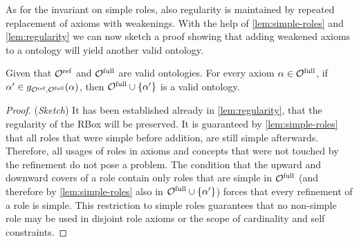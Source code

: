 As for the invariant on simple roles, also regularity is maintained by repeated replacement of axioms with weakenings. With the help of \cref{lem:simple-roles} and \cref{lem:regularity} we can now sketch a proof showing that adding weakened axioms to a \SROIQ ontology will yield another valid \SROIQ ontology.

\begin{theorem} \label{lem:global-constraints}
  Given that ${\mathcal{O}^\textnormal{ref}}$ and ${\mathcal{O}^\textnormal{full}}$ are valid \SROIQ ontologies. For every axiom $\alpha \in {\mathcal{O}^\textnormal{full}}$, if $\alpha' \in g_{{\mathcal{O}^\textnormal{ref}},{\mathcal{O}^\textnormal{full}}}(\alpha)$, then ${\mathcal{O}^\textnormal{full}} \cup \{ \alpha' \}$ is a valid \SROIQ ontology.
\end{theorem}

\begin{proof}(\emph{Sketch})
  It has been established already in \cref{lem:regularity}, that the regularity of the RBox will be preserved.
  It is guaranteed by \cref{lem:simple-roles} that all roles that were simple before addition, are still simple afterwards. Therefore, all usages of roles in axioms and concepts that were not touched by the refinement do not pose a problem. The condition that the upward and downward covers of a role contain only roles that are simple in ${\mathcal{O}^\textnormal{full}}$ (and therefore by \cref{lem:simple-roles} also in ${\mathcal{O}^\textnormal{full}} \cup \{ \alpha' \}$) forces that every refinement of a role is simple. This restriction to simple roles guarantees that no non-simple role may be used in disjoint role axioms or the scope of cardinality and self constraints.
\end{proof}
